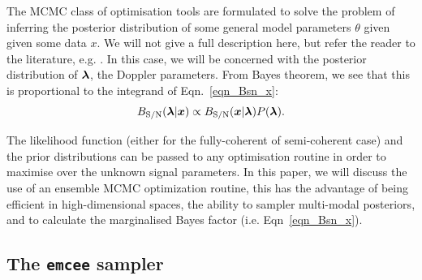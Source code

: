 \documentclass[aps, prd, twocolumn, superscriptaddress, floatfix, showpacs, nofootinbib, longbibliography]{revtex4-1}
\begin{document}
%

The MCMC class of optimisation tools are formulated to solve the problem of
inferring the posterior distribution of some general model parameters $\theta$
given given some data $x$. We will not give a full description here, but
refer the reader to the literature, e.g. \citet{mackay2003information}.
In this case, we will be concerned with the posterior
distribution of $\boldsymbol{\mathbf{\lambda}}$, the Doppler parameters. From Bayes theorem, we
see that this is proportional to the integrand of Eqn.~\eqref{eqn_Bsn_x}:
\begin{equation}
B_{\rm S/N}(\boldsymbol{\mathbf{\lambda}} | \boldsymbol{x}) \propto B_{\rm S/N}(\boldsymbol{x}| \boldsymbol{\mathbf{\lambda}})P(\boldsymbol{\mathbf{\lambda}}).
\end{equation}

The likelihood function (either for the fully-coherent of semi-coherent case)
and the prior distributions can be passed to any optimisation routine in order
to maximise over the unknown signal parameters. In this paper, we will discuss
the use of an ensemble MCMC optimization routine, this has the advantage of
being efficient in high-dimensional spaces, the ability to sampler multi-modal
posteriors, and to calculate the marginalised Bayes factor (i.e.
Eqn~\ref{eqn_Bsn_x}).

\subsection{The \texttt{emcee} sampler}
\end{document}
